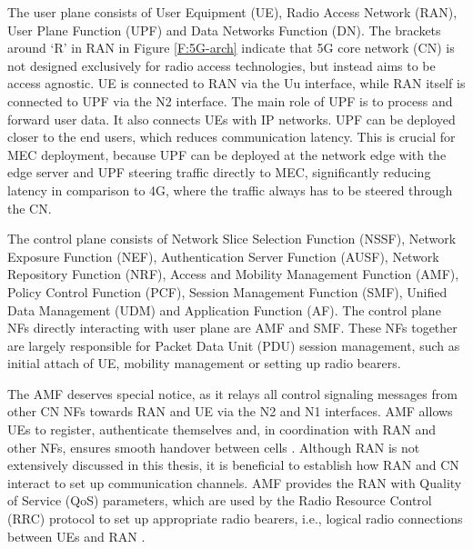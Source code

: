 \documentclass[12pt,a4paper,twoside]{report}
\begin{document}
The user plane consists of User Equipment (UE), Radio Access Network (RAN), User Plane Function (UPF) and Data Networks Function (DN). The brackets around ‘R’ in RAN in Figure \ref{F:5G-arch} indicate that 5G core network (CN) is not designed exclusively for radio access technologies, but instead aims to be access agnostic. UE is connected to RAN via the Uu interface, while RAN itself is connected to UPF via the N2 interface. The main role of UPF is to process and forward user data. It also connects UEs with IP networks. UPF can be deployed closer to the end users, which reduces communication latency. This is crucial for MEC deployment, because UPF can be deployed at the network edge with the edge server and UPF steering traffic directly to MEC, significantly reducing latency in comparison to 4G, where the traffic always has to be steered through the CN. \cite{rommer20195g}

The control plane consists of Network Slice Selection Function (NSSF), Network Exposure Function (NEF), Authentication Server Function (AUSF), Network Repository Function (NRF), Access and Mobility Management Function (AMF), Policy Control Function (PCF), Session Management Function (SMF), Unified Data Management (UDM) and Application Function (AF). The control plane NFs directly interacting with user plane are AMF and SMF. These NFs together are largely responsible for Packet Data Unit (PDU) session management, such as initial attach of UE, mobility management or setting up radio bearers. \cite{rommer20195g}
  
The AMF deserves special notice, as it relays all control signaling messages from other CN NFs towards RAN and UE via the N2 and N1 interfaces. AMF allows UEs to register, authenticate themselves and, in coordination with RAN and other NFs, ensures smooth handover between cells \cite{rommer20195g}. Although RAN is not extensively discussed in this thesis, it is beneficial to establish how RAN and CN interact to set up communication channels. AMF provides the RAN with Quality of Service (QoS) parameters, which are used by the Radio Resource Control (RRC) protocol to set up appropriate radio bearers, i.e., logical radio connections between UEs and RAN \cite{dahlman-2020-5g}.
  
\end{document}
